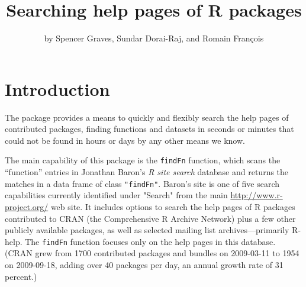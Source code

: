 \title{Searching help pages of R packages}
\author{by Spencer Graves, Sundar Dorai-Raj, and Romain Fran\c{c}ois}

\maketitle

\section{Introduction}
The  package provides a means to quickly and flexibly
search the help pages of contributed packages, finding
functions and datasets in seconds or minutes that could not be
found in hours or days by any other means we know.

The main capability of this package is the {\tt findFn} function,
which scans the ``function'' entries in Jonathan Baron's \emph{R site search}
database \citep{JB09URL} and returns the matches in a data frame of class
{\tt "findFn"}.  Baron's site is one of five
search capabilities currently identified under "Search" from the main
\url{http://www.r-project.org/} web site.  It includes options to
search the help pages of R packages contributed to CRAN (the
Comprehensive R Archive Network) plus a few other publicly
available packages, as well as selected mailing list archives---primarily
R-help.  The {\tt findFn} function focuses only
on the help pages in this database.  (CRAN grew from 1700 contributed
packages and bundles on 2009-03-11 to 1954 on 2009-09-18,
adding over 40 packages per day, an annual growth rate of 31 percent.)

